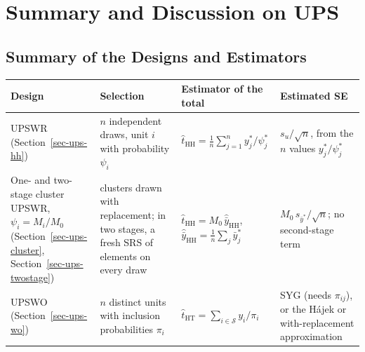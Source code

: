 \documentclass[
  letterpaper,
  DIV=11,
  numbers=noendperiod]{scrreprt}
\newcounter{none} %
\renewcommand{\[}{\begin{equation}}
\renewcommand{\]}{\end{equation}}
\begin{document}
\section{Summary and Discussion on UPS}\label{sec-ups-summary}

\subsection{Summary of the Designs and
Estimators}\label{sec-ups-summary-table}

{\def\LTcaptype{none} %
\begin{longtable}[]{@{}
  >{\raggedright\arraybackslash}p{}
  >{\raggedright\arraybackslash}p{}
  >{\raggedright\arraybackslash}p{}
  >{\raggedright\arraybackslash}p{}@{}}
\toprule\noalign{}
\begin{minipage}[b]{\linewidth}\raggedright
Design
\end{minipage} & \begin{minipage}[b]{\linewidth}\raggedright
Selection
\end{minipage} & \begin{minipage}[b]{\linewidth}\raggedright
Estimator of the total
\end{minipage} & \begin{minipage}[b]{\linewidth}\raggedright
Estimated SE
\end{minipage} \\
\midrule\noalign{}
\endhead
\bottomrule\noalign{}
\endlastfoot
UPSWR (Section~\ref{sec-ups-hh}) & \(n\) independent draws, unit \(i\)
with probability \(\psi_i\) &
\(\hat t_{\mathrm{HH}}=\frac1n\sum_{j=1}^n y_j^*/\psi_j^*\) &
\(s_u/\sqrt n\), from the \(n\) values \(y_j^*/\psi_j^*\) \\
One- and two-stage cluster UPSWR, \(\psi_i=M_i/M_0\)
(Section~\ref{sec-ups-cluster}, Section~\ref{sec-ups-twostage}) &
clusters drawn with replacement; in two stages, a fresh SRS of elements
on every draw &
\(\hat t_{\mathrm{HH}}=M_0\,\hat{\bar y}_{\mathrm{HH}}\),
\(\hat{\bar y}_{\mathrm{HH}}=\frac1n\sum_j\bar y_j^*\) &
\(M_0\,s_{\bar y^*}/\sqrt n\); no second-stage term \\
UPSWO (Section~\ref{sec-ups-wo}) & \(n\) distinct units with inclusion
probabilities \(\pi_i\) &
\(\hat t_{\mathrm{HT}}=\sum_{i\in\mathcal S}y_i/\pi_i\) & SYG (needs
\(\pi_{ij}\)), or the Hájek or with-replacement approximation \\
\end{longtable}
}
\end{document}
